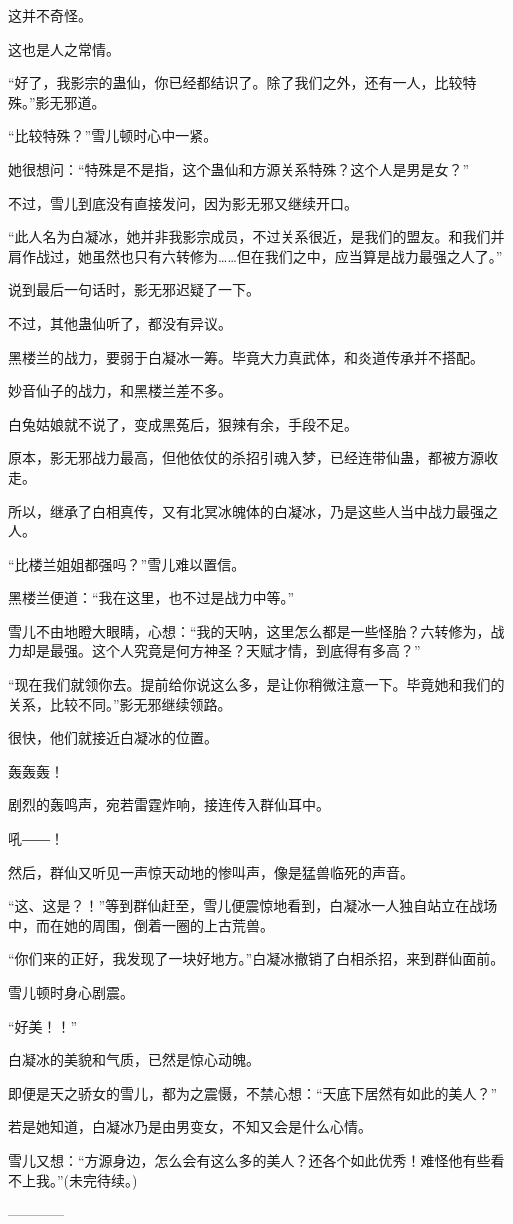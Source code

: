 \begin{this_body}
这并不奇怪。

这也是人之常情。

“好了，我影宗的蛊仙，你已经都结识了。除了我们之外，还有一人，比较特殊。”影无邪道。

“比较特殊？”雪儿顿时心中一紧。

她很想问：“特殊是不是指，这个蛊仙和方源关系特殊？这个人是男是女？”

不过，雪儿到底没有直接发问，因为影无邪又继续开口。

“此人名为白凝冰，她并非我影宗成员，不过关系很近，是我们的盟友。和我们并肩作战过，她虽然也只有六转修为……但在我们之中，应当算是战力最强之人了。”

说到最后一句话时，影无邪迟疑了一下。

不过，其他蛊仙听了，都没有异议。

黑楼兰的战力，要弱于白凝冰一筹。毕竟大力真武体，和炎道传承并不搭配。

妙音仙子的战力，和黑楼兰差不多。

白兔姑娘就不说了，变成黑菟后，狠辣有余，手段不足。

原本，影无邪战力最高，但他依仗的杀招引魂入梦，已经连带仙蛊，都被方源收走。

所以，继承了白相真传，又有北冥冰魄体的白凝冰，乃是这些人当中战力最强之人。

“比楼兰姐姐都强吗？”雪儿难以置信。

黑楼兰便道：“我在这里，也不过是战力中等。”

雪儿不由地瞪大眼睛，心想：“我的天呐，这里怎么都是一些怪胎？六转修为，战力却是最强。这个人究竟是何方神圣？天赋才情，到底得有多高？”

“现在我们就领你去。提前给你说这么多，是让你稍微注意一下。毕竟她和我们的关系，比较不同。”影无邪继续领路。

很快，他们就接近白凝冰的位置。

轰轰轰！

剧烈的轰鸣声，宛若雷霆炸响，接连传入群仙耳中。

吼――！

然后，群仙又听见一声惊天动地的惨叫声，像是猛兽临死的声音。

“这、这是？！”等到群仙赶至，雪儿便震惊地看到，白凝冰一人独自站立在战场中，而在她的周围，倒着一圈的上古荒兽。

“你们来的正好，我发现了一块好地方。”白凝冰撤销了白相杀招，来到群仙面前。

雪儿顿时身心剧震。

“好美！！”

白凝冰的美貌和气质，已然是惊心动魄。

即便是天之骄女的雪儿，都为之震慑，不禁心想：“天底下居然有如此的美人？”

若是她知道，白凝冰乃是由男变女，不知又会是什么心情。

雪儿又想：“方源身边，怎么会有这么多的美人？还各个如此优秀！难怪他有些看不上我。”(未完待续。)

------------

\end{this_body}

